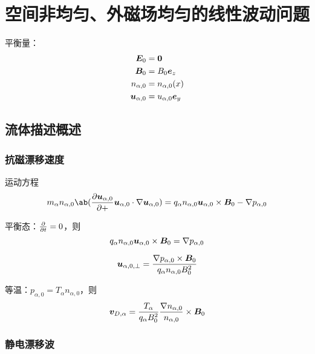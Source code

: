 
\chapter{空间非均匀、外磁场均匀的线性波动问题}

平衡量：
\begin{subequations}\begin{align}
\bm{E}_0 &= \bm{0} \\
\bm{B}_0 &= B_0 \bm{e}_z \\
n_{\alpha,0} &= n_{\alpha,0}(x) \\
\bm{u}_{\alpha,0} &= u_{\alpha,0} \bm{e}_y
\end{align}\end{subequations}

\section{流体描述概述}

\subsection{抗磁漂移速度}

运动方程
\begin{equation}
m_\alpha n_{\alpha,0} \ab(
    \pdv{\vector{u}_{\alpha,0}}
    + \vector{u}_{\alpha,0} \cdot \grad{\vector{u}_{\alpha,0}}
)
= q_\alpha n_{\alpha,0} \vector{u}_{\alpha,0} \times \vector{B}_0
- \grad{p_{\alpha,0}}
\end{equation}

平衡态：$\pdv{}{t} = 0$，则
\begin{equation}
q_\alpha n_{\alpha,0} \bm{u}_{\alpha,0} \times \bm{B}_0 = \nabla {p_{\alpha,0}}
\end{equation}

\begin{equation}
\bm{u}_{\alpha,0,\perp} = \frac{
    \nabla {p_{\alpha,0}} \times \bm{B}_0
}{q_\alpha n_{\alpha,0} B_0^2}
\end{equation}

等温：$p_{\alpha,0} = T_\alpha n_{\alpha,0}$，则
\begin{equation}
\bm{v}_{D,\alpha} = \frac{T_\alpha}{q_\alpha B_0^2}
\frac{\nabla {n_{\alpha,0}}}{n_{\alpha,0}} \times \bm{B}_0
\end{equation}

\subsection{静电漂移波}

